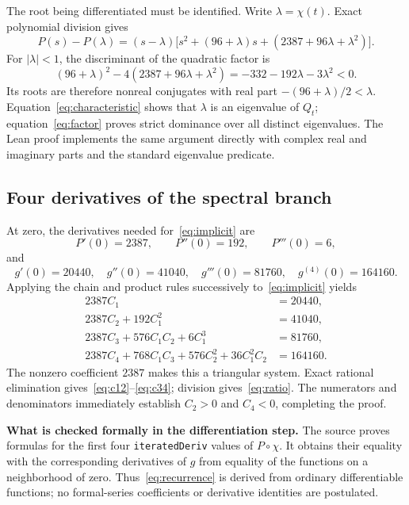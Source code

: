 \documentclass[11pt,a4paper]{article}
\begin{document}
The root being differentiated must be identified. Write $\lambda=\chi(t)$. Exact polynomial division gives
\begin{equation}
P(s)-P(\lambda)=(s-\lambda)
\bigl[s^2+(96+\lambda)s+(2387+96\lambda+\lambda^2)\bigr].
\label{eq:factor}
\end{equation}
For $|\lambda|<1$, the discriminant of the quadratic factor is
\[
(96+\lambda)^2-4(2387+96\lambda+\lambda^2)
=-332-192\lambda-3\lambda^2<0.
\]
Its roots are therefore nonreal conjugates with real part $-(96+\lambda)/2<\lambda$. Equation~\eqref{eq:characteristic} shows that $\lambda$ is an eigenvalue of $Q_t$; equation~\eqref{eq:factor} proves strict dominance over all distinct eigenvalues. The Lean proof implements the same argument directly with complex real and imaginary parts and the standard eigenvalue predicate.

\subsection{Four derivatives of the spectral branch}
At zero, the derivatives needed for~\eqref{eq:implicit} are
\[
P'(0)=2387,\qquad P''(0)=192,\qquad P'''(0)=6,
\]
and
\[
g'(0)=20440,\quad g''(0)=41040,\quad
g'''(0)=81760,\quad g^{(4)}(0)=164160.
\]
Applying the chain and product rules successively to~\eqref{eq:implicit} yields
\begin{align}
2387C_1&=20440,\nonumber\\
2387C_2+192C_1^2&=41040,\nonumber\\
2387C_3+576C_1C_2+6C_1^3&=81760,\nonumber\\
2387C_4+768C_1C_3+576C_2^2+36C_1^2C_2&=164160.
\label{eq:recurrence}
\end{align}
The nonzero coefficient $2387$ makes this a triangular system. Exact rational elimination gives~\eqref{eq:c12}--\eqref{eq:c34}; division gives~\eqref{eq:ratio}. The numerators and denominators immediately establish $C_2>0$ and $C_4<0$, completing the proof.

\textbf{What is checked formally in the differentiation step.} The source proves formulas for the first four \texttt{iteratedDeriv} values of $P\circ\chi$. It obtains their equality with the corresponding derivatives of $g$ from equality of the functions on a neighborhood of zero. Thus~\eqref{eq:recurrence} is derived from ordinary differentiable functions; no formal-series coefficients or derivative identities are postulated.
\end{document}
